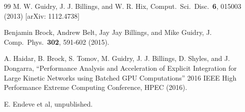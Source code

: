 \documentclass[11pt]{article}
\newcommand{\reaclib}{\mbox{ReacLib}}
\begin{document}
\begin{thebibliography} {99}
 M. W. Guidry, J. J. Billings, and W. R. Hix, Comput.\ Sci.\ 
Disc.\ {\bf 6}, 015003 (2013) [arXiv: 1112.4738]

\bibitem{brockJCP}Benjamin Brock, Andrew Belt, Jay Jay Billings, and Mike 
Guidry, J. Comp.\ Phys.\ {\bf 302}, 591-602 (2015).

A. Haidar, B. Brock, S. Tomov, M. Guidry, J. J. Billings, D. 
Shyles, and J. Dongarra, ``Performance Analysis and Acceleration of Explicit 
Integration for Large Kinetic Networks using Batched GPU Computations'' 2016 
IEEE High Performance Extreme Computing Conference, HPEC (2016).

E. Endeve et al, unpublished.

% 
% 
% 
% 
% 
% 

\end{thebibliography}
\end{document}
